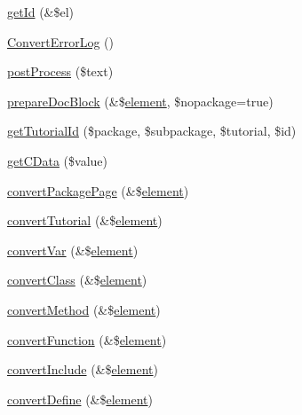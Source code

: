 \begin{DoxyCompactItemize}
\item 
\hyperlink{class_x_m_l_doc_book_converter_a7731621dfe131fa46624b8a5529b6872}{get\-Id} (\&\$el)
\item 
\hyperlink{class_x_m_l_doc_book_converter_a5a02e88d6dba03b66f46fd411e5ac2c2}{\-Convert\-Error\-Log} ()
\item 
\hyperlink{class_x_m_l_doc_book_converter_a0b2058070d303b4d06535be248b021ab}{post\-Process} (\$text)
\item 
\hyperlink{class_x_m_l_doc_book_converter_a51865de1c35df577a5f62a586a9eebcd}{prepare\-Doc\-Block} (\&\$\hyperlink{bug-904820_8php_aa94081298ab2dfd0f261cce6c203d9aa}{element}, \$nopackage=true)
\item 
\hyperlink{class_x_m_l_doc_book_converter_a98de4e6484c42e491de454411f606871}{get\-Tutorial\-Id} (\$package, \$subpackage, \$tutorial, \$id)
\item 
\hyperlink{class_x_m_l_doc_book_converter_a37fe6f6ddd1cd15d360788064dce7a43}{get\-C\-Data} (\$value)
\item 
\hyperlink{class_x_m_l_doc_book_converter_a0fec4277d9e989c2654a44b73de386d3}{convert\-Package\-Page} (\&\$\hyperlink{bug-904820_8php_aa94081298ab2dfd0f261cce6c203d9aa}{element})
\item 
\hyperlink{class_x_m_l_doc_book_converter_a129673c76d85dfee7bd2170d59b33fba}{convert\-Tutorial} (\&\$\hyperlink{bug-904820_8php_aa94081298ab2dfd0f261cce6c203d9aa}{element})
\item 
\hyperlink{class_x_m_l_doc_book_converter_ac5907fa8ea3429f4823e8f937b5a98c1}{convert\-Var} (\&\$\hyperlink{bug-904820_8php_aa94081298ab2dfd0f261cce6c203d9aa}{element})
\item 
\hyperlink{class_x_m_l_doc_book_converter_afec21ed9dd3b8ac7495c4d6d5741d7af}{convert\-Class} (\&\$\hyperlink{bug-904820_8php_aa94081298ab2dfd0f261cce6c203d9aa}{element})
\item 
\hyperlink{class_x_m_l_doc_book_converter_ad2593363c9de7c36ee6f4f7de17ba94d}{convert\-Method} (\&\$\hyperlink{bug-904820_8php_aa94081298ab2dfd0f261cce6c203d9aa}{element})
\item 
\hyperlink{class_x_m_l_doc_book_converter_acd30d12b8e21ce245f1b9dbbf8bf29b0}{convert\-Function} (\&\$\hyperlink{bug-904820_8php_aa94081298ab2dfd0f261cce6c203d9aa}{element})
\item 
\hyperlink{class_x_m_l_doc_book_converter_a548baade863d365286d46ca66564711f}{convert\-Include} (\&\$\hyperlink{bug-904820_8php_aa94081298ab2dfd0f261cce6c203d9aa}{element})
\item 
\hyperlink{class_x_m_l_doc_book_converter_a9f23827e97c2672a94ff615d9bb00601}{convert\-Define} (\&\$\hyperlink{bug-904820_8php_aa94081298ab2dfd0f261cce6c203d9aa}{element})

\end{DoxyCompactItemize}
